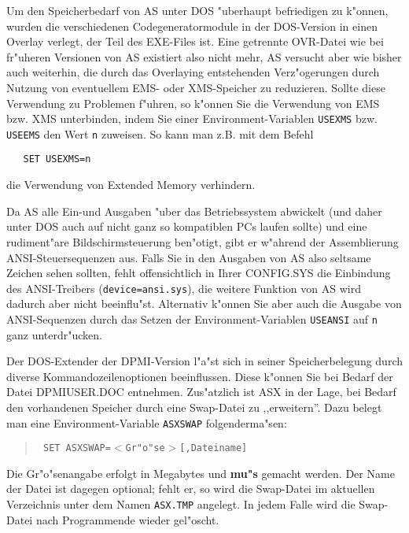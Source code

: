 \documentclass[12pt,a4paper,twoside]{report}
\newcommand{\bb}[1]{{\bf #1}}
\newcommand{\tty}[1]{{\tt #1}}
\begin{document}
Um den  Speicherbedarf von AS unter DOS "uberhaupt
befriedigen zu k"onnen, wurden die verschiedenen Codegeneratormodule in
der DOS-Version in einen Overlay verlegt, der Teil des EXE-Files ist.
Eine getrennte OVR-Datei wie bei fr"uheren Versionen von AS existiert also
nicht mehr, AS versucht aber wie bisher auch weiterhin, die durch das
Overlaying entstehenden Verz"ogerungen durch Nutzung von eventuellem EMS-
oder XMS-Speicher zu reduzieren.  Sollte diese Verwendung zu Problemen
f"uhren, so k"onnen Sie die Verwendung von EMS bzw. XMS unterbinden, indem
Sie einer Environment-Variablen \tty{USEXMS} bzw. \tty{USEEMS} den Wert
\tty{n} zuweisen.  So kann man z.B. mit dem Befehl
\begin{verbatim}
   SET USEXMS=n
\end{verbatim}
die Verwendung von Extended Memory verhindern.
\par
Da AS alle Ein-und Ausgaben "uber das Betriebssystem abwickelt (und daher
unter DOS auch auf nicht ganz so kompatiblen PCs laufen sollte) und eine
rudiment"are Bildschirmsteuerung ben"otigt, gibt er w"ahrend der
Assemblierung ANSI-Steuersequenzen aus.
Falls Sie in den Ausgaben von AS  also seltsame
Zeichen sehen sollten, fehlt offensichtlich in Ihrer CONFIG.SYS die
Einbindung des ANSI-Trei\-bers (\tty{device=\-ansi.sys}), die weitere Funktion
von AS  wird dadurch aber nicht beeinflu"st. Alternativ
k"onnen Sie aber auch die Ausgabe von ANSI-Sequenzen durch das Setzen der
Environment-Variablen \tty{USEANSI} auf \tty{n} ganz unterdr"ucken.

Der DOS-Extender der DPMI-Version  l"a"st sich in
seiner Speicherbelegung durch diverse Kommandozeilenoptionen beeinflussen.
Diese k"onnen Sie bei Bedarf der Datei DPMIUSER.DOC entnehmen.
Zus"atzlich ist ASX in der Lage, bei Bedarf den vorhandenen Speicher
durch eine Swap-Datei zu ,,erweitern''.  Dazu belegt man eine
Environment-Variable \tty{ASXSWAP} folgenderma"sen:
\begin{quote}{\tt
  SET ASXSWAP=$<$Gr"o"se$>$[,Dateiname]
}\end{quote}
Die Gr"o"senangabe erfolgt in Megabytes und \bb{mu"s} gemacht werden.  Der
Name der Datei ist dagegen optional; fehlt er, so wird die Swap-Datei im
aktuellen Verzeichnis unter dem Namen \tty{ASX.TMP} angelegt.  In jedem
Falle wird die Swap-Datei nach Programmende wieder gel"oscht.
\end{document}
